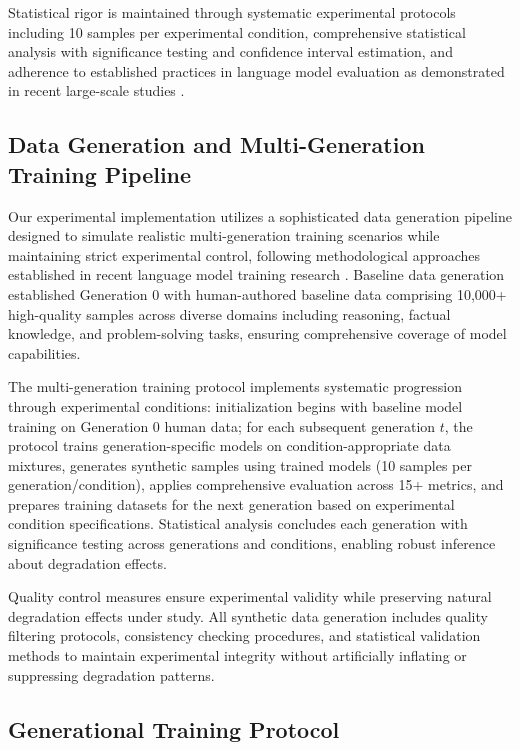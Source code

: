 \documentclass{article}
\begin{document}
Statistical rigor is maintained through systematic experimental protocols including 10 samples per experimental condition, comprehensive statistical analysis with significance testing and confidence interval estimation, and adherence to established practices in language model evaluation as demonstrated in recent large-scale studies \cite{brown2020language, touvron2023llama}.

\subsection{Data Generation and Multi-Generation Training Pipeline}

Our experimental implementation utilizes a sophisticated data generation pipeline designed to simulate realistic multi-generation training scenarios while maintaining strict experimental control, following methodological approaches established in recent language model training research \cite{ouyang2022training}. Baseline data generation established Generation 0 with human-authored baseline data comprising 10,000+ high-quality samples across diverse domains including reasoning, factual knowledge, and problem-solving tasks, ensuring comprehensive coverage of model capabilities.

The multi-generation training protocol implements systematic progression through experimental conditions: initialization begins with baseline model training on Generation 0 human data; for each subsequent generation $t$, the protocol trains generation-specific models on condition-appropriate data mixtures, generates synthetic samples using trained models (10 samples per generation/condition), applies comprehensive evaluation across 15+ metrics, and prepares training datasets for the next generation based on experimental condition specifications. Statistical analysis concludes each generation with significance testing across generations and conditions, enabling robust inference about degradation effects.

Quality control measures ensure experimental validity while preserving natural degradation effects under study. All synthetic data generation includes quality filtering protocols, consistency checking procedures, and statistical validation methods to maintain experimental integrity without artificially inflating or suppressing degradation patterns.

\subsection{Generational Training Protocol}
\end{document}
